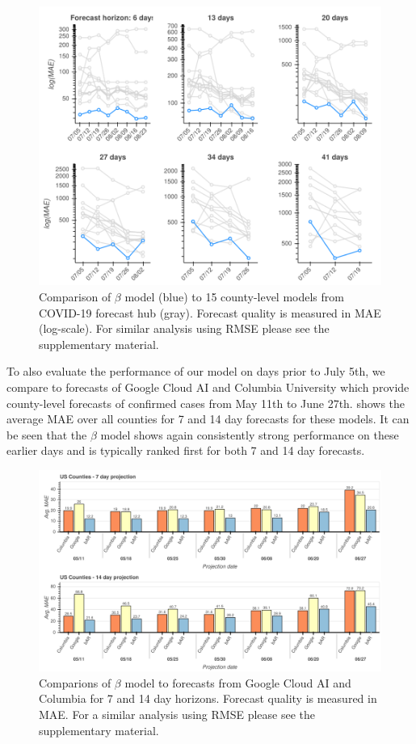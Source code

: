 \documentclass[nobib]{tufte-handout}
\newcommand{\bAR}{\ensuremath{\beta}\text{-AR}\xspace}
\begin{document}
\begin{figure}[htbp]
\centering
\includegraphics[width=\columnwidth]{img/us_mae/us_mae.png}
\caption{\label{fig:mae-covidhub}Comparison of \bAR model (blue) to 15 county-level models from COVID-19 forecast hub (gray). Forecast quality is measured in MAE (log-scale). For similar analysis using RMSE please see the supplementary material.}
\end{figure}


To also evaluate the performance of our model on days prior to July 5th, we
compare to forecasts of Google Cloud AI \citep{arik2020interpretable} and Columbia
University \citep{forecasts/columbia} which provide county-level forecasts of
confirmed cases from May 11th to June 27th.  shows the average
MAE over all counties for 7 and 14 day forecasts for these models.
It can be seen that the \bAR model shows again consistently strong performance on these
earlier days and is typically ranked first for both 7 and 14 day forecasts.

\begin{figure}
\centering
\includegraphics[width=\columnwidth]{img/counties_bar_mae.png}
\caption{\label{fig:mae-google}Comparions of \bAR model to forecasts from Google Cloud AI and Columbia for 7 and 14 day horizons. Forecast quality is measured in MAE. For a similar analysis using RMSE please see the supplementary material.}
\end{figure}
\end{document}
